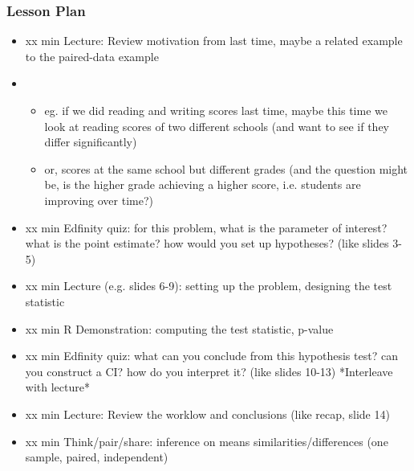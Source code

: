 \begin{frame}
    \frametitle{Lesson Plan}
    \begin{itemize}
        \item xx min Lecture: Review motivation from last time, maybe a related example to the paired-data example
        \item \begin{itemize}
            \item eg. if we did reading and writing scores last time, maybe this time we look at reading scores of two different schools (and want to see if they differ significantly)
            \item or, scores at the same school but different grades (and the question might be, is the higher grade achieving a higher score, i.e. students are improving over time?)
        \end{itemize}
        \item xx min Edfinity quiz: for this problem, what is the parameter of interest? what is the point estimate? how would you set up hypotheses? (like slides 3-5)
        \item xx min Lecture (e.g. slides 6-9): setting up the problem, designing the test statistic
        \item xx min R Demonstration: computing the test statistic, p-value
        \item xx min Edfinity quiz: what can you conclude from this hypothesis test? can you construct a CI? how do you interpret it? (like slides 10-13) *Interleave with lecture*
        \item xx min Lecture: Review the worklow and conclusions (like recap, slide 14)
        \item xx min Think/pair/share: inference on means similarities/differences (one sample, paired, independent)
    \end{itemize}
\end{frame}

